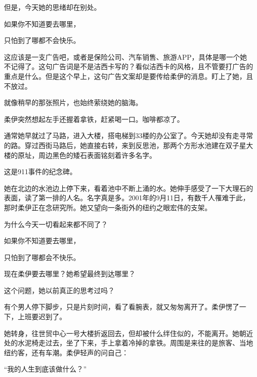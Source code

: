 但是，今天她的思绪却在别处。

{\kaishu 如果你不知道要去哪里，}

{\kaishu 只怕到了哪都不会快乐。}

这应该是一支广告吧，或者是保险公司、汽车销售、旅游APP，具体是哪一个她不记得了。这句广告词是不是洁西卡写的？看似洁西卡的风格，且不管要打广告的重点是什么。但是这个早上，这句广告文案却是要传给柔伊的消息。盯上了她，且不放过。

就像稍早的那张照片，也始终萦绕她的脑海。

柔伊突然想起左手还握着拿铁，赶紧喝一口。咖啡都凉了。

通常她早就过了马路，进入大楼，搭电梯到33楼的办公室了。今天她却没有走寻常的路。穿过西街马路后，她直接右转，来到反思池，那两个方形水池建在双子星大楼的原址，周边黑色的矮石表面铭刻着许多名字。

这是911事件的纪念碑。

她在北边的水池边上停下来，看着池中不断上涌的水。她伸手感受了一下大理石的表面，读了第一排的人名。名字真是多。2001年的9月11日，有数千人罹难于此，那时柔伊正在念研究所。她又望向一条街外的纽约之眼宏伟的支架。

为什么今天一切看起来都不同了？

{\kaishu 如果你不知道要去哪里，}

{\kaishu 只怕到了哪都会不快乐。}

现在柔伊要去哪里？她希望最终到达哪里？

这个问题，她以前真正的思考过吗？

有个男人停下脚步，只是片刻时间，看了看腕表，就又匆匆离开了。柔伊愣了一下，上班要迟到了。

她转身，往世贸中心一号大楼折返回去，但却被什么绊住似的，不能离开。她朝近处的水泥椅走过去，坐了下来，手上拿着冷掉的拿铁。周围是来往的是旅客、当地纽约客，还有车潮。柔伊轻声的问自己：

“我的人生到底该做什么？”
